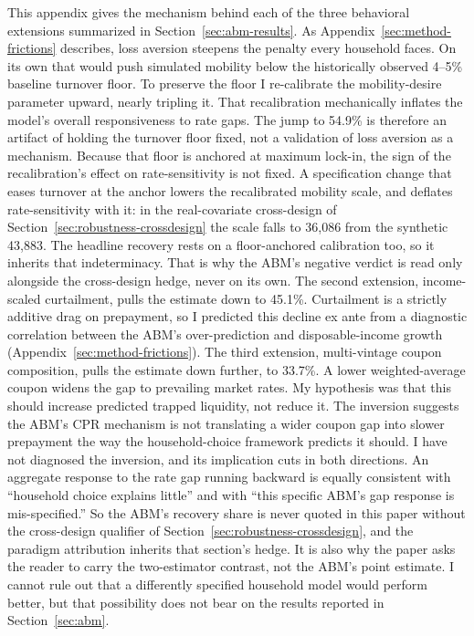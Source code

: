\documentclass[12pt]{article}
\begin{document}
This appendix gives the mechanism behind each of the three behavioral extensions summarized in Section~\ref{sec:abm-results}. As Appendix~\ref{sec:method-frictions} describes, loss aversion steepens the penalty every household faces. On its own that would push simulated mobility below the historically observed 4--5\% baseline turnover floor. To preserve the floor I re-calibrate the mobility-desire parameter upward, nearly tripling it. That recalibration mechanically inflates the model's overall responsiveness to rate gaps. The jump to 54.9\% is therefore an artifact of holding the turnover floor fixed, not a validation of loss aversion as a mechanism. Because that floor is anchored at maximum lock-in, the sign of the recalibration's effect on rate-sensitivity is not fixed. A specification change that eases turnover at the anchor lowers the recalibrated mobility scale, and deflates rate-sensitivity with it: in the real-covariate cross-design of Section~\ref{sec:robustness-crossdesign} the scale falls to 36,086 from the synthetic 43,883. The headline recovery rests on a floor-anchored calibration too, so it inherits that indeterminacy. That is why the ABM's negative verdict is read only alongside the cross-design hedge, never on its own. The second extension, income-scaled curtailment, pulls the estimate down to 45.1\%. Curtailment is a strictly additive drag on prepayment, so I predicted this decline ex ante from a diagnostic correlation between the ABM's over-prediction and disposable-income growth (Appendix~\ref{sec:method-frictions}). The third extension, multi-vintage coupon composition, pulls the estimate down further, to 33.7\%. A lower weighted-average coupon widens the gap to prevailing market rates. My hypothesis was that this should increase predicted trapped liquidity, not reduce it. The inversion suggests the ABM's CPR mechanism is not translating a wider coupon gap into slower prepayment the way the household-choice framework predicts it should. I have not diagnosed the inversion, and its implication cuts in both directions. An aggregate response to the rate gap running backward is equally consistent with ``household choice explains little'' and with ``this specific ABM's gap response is mis-specified.'' So the ABM's recovery share is never quoted in this paper without the cross-design qualifier of Section~\ref{sec:robustness-crossdesign}, and the paradigm attribution inherits that section's hedge. It is also why the paper asks the reader to carry the two-estimator contrast, not the ABM's point estimate. I cannot rule out that a differently specified household model would perform better, but that possibility does not bear on the results reported in Section~\ref{sec:abm}.
\end{document}
